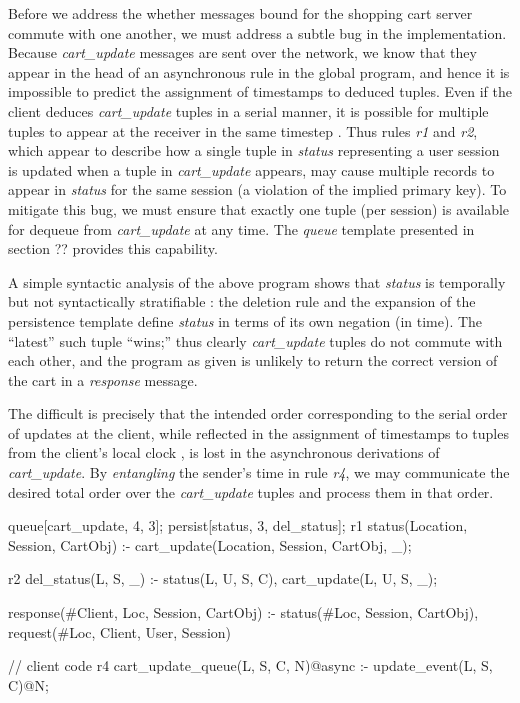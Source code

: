 Before we address the whether messages bound for the shopping cart server commute 
with one another, we must address a subtle bug in the implementation.  Because {\em cart\_update}
messages are sent over the network, we know that they appear in the head of an asynchronous 
rule in the global program, and hence it is impossible to predict the assignment of timestamps
to deduced tuples.  Even if the client deduces {\em cart\_update} tuples in a serial manner, it
is possible for multiple tuples to appear at the receiver in the same timestep .  Thus rules {\em r1} 
and {\em r2}, which appear to describe how a single tuple in {\em status} representing a user
session is updated when a tuple in {\em cart\_update} appears, may cause multiple records
to appear in {\em status} for the same session (a violation of the implied primary key).
To mitigate this bug, we must ensure that exactly one tuple (per session) is available for dequeue
from {\em cart\_update} at any time.  The \emph{queue} template presented in section ?? 
provides this capability.

A simple syntactic analysis of the above program shows that {\em status} 
is temporally but not syntactically stratifiable : the deletion rule and the expansion of the
persistence template define {\em status} in terms of its own negation (in time).  The ``latest''
such tuple ``wins;'' thus clearly {\em cart\_update} tuples do not commute with each other,
and the program as given is unlikely to return the correct version of the cart in a {\em response}
message.

The difficult is precisely that the intended order corresponding to the serial order of updates
at the client, while reflected in the assignment of timestamps to tuples from the client's
local clock , is lost in the asynchronous derivations of {\em cart\_update}.  By \emph{entangling}
the sender's time in rule  {\em r4}, we may communicate the desired total order over 
the {\em cart\_update} tuples and process them in that order.  

\begin{Dedalus}
queue[cart_update, 4, 3];
persist[status, 3, del_status];
r1
status(Location, Session, CartObj) :-
    cart_update(Location,  Session, CartObj, _);
    
r2
del_status(L, S, _) :-
    status(L, U, S, C),
    cart_update(L, U, S, _);

response(#Client, Loc, Session, CartObj) :-
    status(#Loc, Session, CartObj),
    request(#Loc, Client, User, Session)

// client code
r4
cart_update_queue(L, S, C, N)@async :- 
    update_event(L, S, C)@N;

\end{Dedalus}

